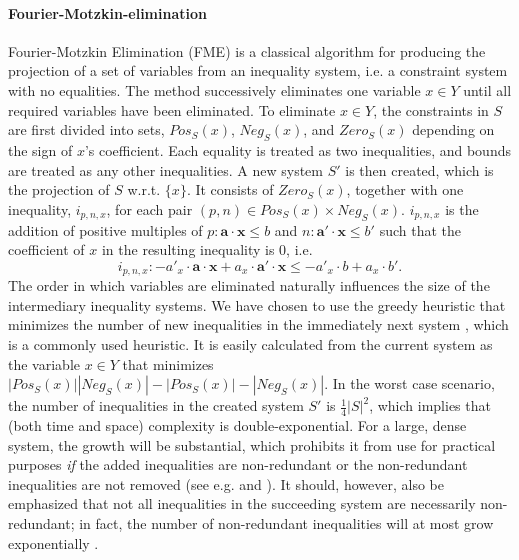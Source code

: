 \documentclass{llncs}
\newcommand{\Pos}{\mathit{Pos}}
\newcommand{\Neg}{\mathit{Neg}}
\newcommand{\mi}{\mathit}
\newcommand{\ve}{\mathbf}
\begin{document}
\paragraph{Fourier-Motzkin-elimination} 
Fourier-Motzkin Elimination (FME) is a classical algorithm for producing the projection of a set of variables from an inequality system, i.e. a constraint system with no equalities. The method successively eliminates one variable $x\in Y$ until all required variables have been eliminated. To eliminate $x\in Y$, the constraints in $S$ are first divided into sets, $\Pos_S(x)$, $\Neg_S(x)$, and $\mi{Zero}_S(x)$ depending on the sign of $x$'s coefficient. 
Each equality is treated as two inequalities, and bounds are treated as any other inequalities. 
A new system $S'$ is then created, which is the projection of $S$ w.r.t. $\{x\}$. It consists of $\mi{Zero}_S(x)$, together with one inequality, $i_{p,n,x}$, for each pair $(p,n)\in \Pos_S(x)\times \Neg_S(x)$. $i_{p,n,x}$ is the addition of positive multiples of $p:\ve{a}\cdot\ve{x} \leq b$ and $n:\ve{a}'\cdot\ve{x} \leq b'$ such that the coefficient of $x$ in the resulting inequality is $0$, i.e.
\[
i_{p,n,x}: -a'_x\cdot \ve{a}\cdot\ve{x} + a_x\cdot \ve{a}'\cdot\ve{x} \leq -a'_x\cdot b + a_x\cdot b'.
\]
The order in which variables are eliminated naturally influences the size of the intermediary inequality systems. We have chosen to use the greedy heuristic {that minimizes the number of new inequalities in the immediately next system \cite{duffin74}}, which is a commonly used heuristic. It is easily calculated from the current system as the variable $x\in Y$ that minimizes $|\Pos_S(x)||\Neg_S(x)| - |\Pos_S(x)|-|\Neg_S(x)|$.  In the worst case scenario, %
the number of inequalities in the created system $S'$ is $\frac{1}{4}|S|^2$, which implies that (both time and space) complexity is double-exponential. For a large, dense system, the growth will be substantial, which prohibits it from use for practical purposes \emph{if} the added inequalities are non-redundant or the non-redundant inequalities are not removed ({see e.g. \cite{lassez93} and \cite{lukatskii08}}). It should, however, also be emphasized that not all inequalities in the succeeding system are necessarily non-redundant; in fact, the number of non-redundant inequalities will at most grow exponentially \cite{monniaux10}.
\end{document}
